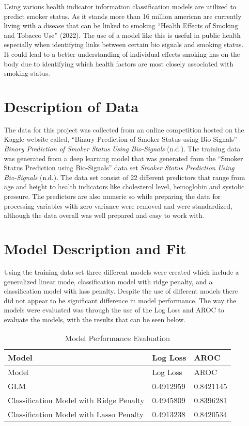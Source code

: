 \documentclass[
  12pt,
  letterpaper,
]{article}
\begin{document}
Using various health indicator information classification models are
utilized to predict smoker status. As it stands more than 16 million
american are currently living with a disease that can be linked to
smoking {``Health {Effects} of {Smoking} and {Tobacco} {Use}''} (2022).
The use of a model like this is useful in public health especially when
identifying links between certain bio signals and smoking status. It
could lead to a better understanding of individual effects smoking has
on the body due to identifying which health factors are most closely
associated with smoking status.

\hypertarget{description-of-data}{%
\section{Description of Data}\label{description-of-data}}

The data for this project was collected from an online competition
hosted on the Kaggle website called, ``Binary Prediction of Smoker
Status using Bio-Signals'' \emph{Binary {Prediction} of {Smoker}
{Status} Using {Bio}-{Signals}} (n.d.). The training data was generated
from a deep learning model that was generated from the ``Smoker Status
Prediction using Bio-Signals'' data set \emph{Smoker {Status}
{Prediction} Using {Bio}-{Signals}} (n.d.). The data set consist of 22
different predictors that range from age and height to health indicators
like cholesterol level, hemoglobin and systolic pressure. The predictors
are also numeric so while preparing the data for processing variables
with zero variance were removed and were standardized, although the data
overall was well prepared and easy to work with.

\hypertarget{model-description-and-fit}{%
\section{Model Description and Fit}\label{model-description-and-fit}}

Using the training data set three different models were created which
include a generalized linear mode, classification model with ridge
penalty, and a classification model with lass penalty. Despite the use
of different models there did not appear to be significant difference in
model performance. The way the models were evaluated was through the use
of the Log Loss and AROC to evaluate the models, with the results that
can be seen below.

\begin{longtable}[]{@{}lll@{}}
\caption{Model Performance Evaluation}\tabularnewline
\toprule\noalign{}
Model & Log Loss & AROC \\
\midrule\noalign{}
\endfirsthead
\toprule\noalign{}
Model & Log Loss & AROC \\
\midrule\noalign{}
\endhead
\bottomrule\noalign{}
\endlastfoot
GLM & 0.4912959 & 0.8421145 \\
Classification Model with Ridge Penalty & 0.4945809 & 0.8396281 \\
Classification Model with Lasso Penalty & 0.4913238 & 0.8420534 \\
\end{longtable}
\end{document}
